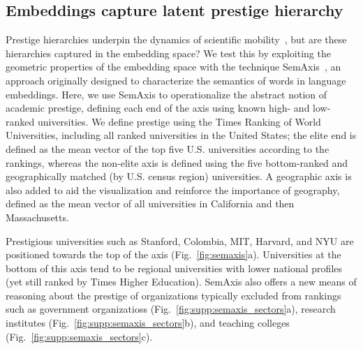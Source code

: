 \documentclass[12pt]{article} %
\begin{document}
%
%
\subsection*{Embeddings capture latent prestige hierarchy}

Prestige hierarchies underpin the dynamics of scientific mobility~\autocite{deville2014career, clauset2015hierarchy}, but are these hierarchies captured in the embedding space?
We test this by exploiting the geometric properties of the embedding space with the technique SemAxis~\autocite{an2018semaxis}, an approach originally designed to characterize the semantics of words in language embeddings.
Here, we use SemAxis to operationalize the abstract notion of academic prestige, defining each end of the axis using known high- and low-ranked universities. 
We define prestige using the Times Ranking of World Universities, including all ranked universities in the United States;
the elite end is defined as the mean vector of the top five U.S. universities according to the rankings, whereas the non-elite axis is defined using the five bottom-ranked and geographically matched (by U.S. census region) universities.
A geographic axis is also added to aid the visualization and reinforce the importance of geography, defined as the mean vector of all universities in California and then Massachusetts. 

Prestigious universities such as Stanford, Colombia, MIT, Harvard, and NYU are positioned towards the top of the axis (Fig.~\ref{fig:semaxis}a).
Universities at the bottom of this axis tend to be regional universities with lower national profiles (yet still ranked by Times Higher Education).
SemAxis also offers a new means of reasoning about the prestige of organizations typically excluded from rankings such as government organizatioss (Fig.~\ref{fig:supp:semaxis_sectors}a), research institutes (Fig.~\ref{fig:supp:semaxis_sectors}b), and teaching colleges (Fig.~\ref{fig:supp:semaxis_sectors}c).
\end{document}
